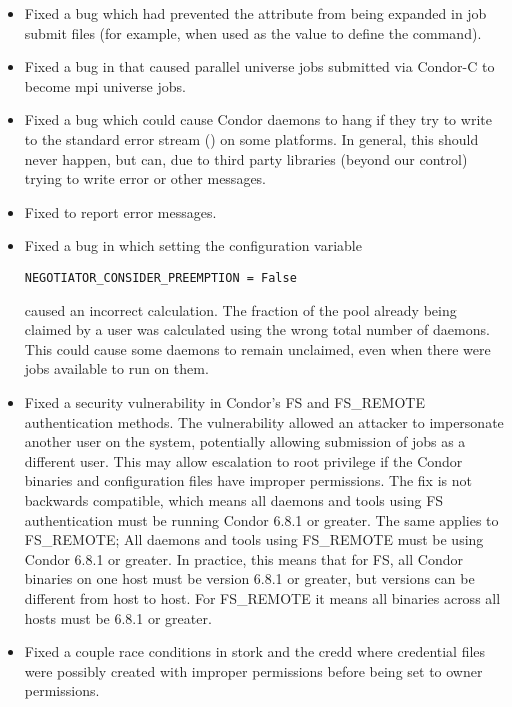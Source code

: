 \begin{itemize}
\item Fixed a  bug which had prevented the
 attribute from being expanded in job submit files
(for example,
when used as the value to define the  command).

\item Fixed a bug in  that caused parallel universe jobs
submitted via Condor-C to become mpi universe jobs.

\item Fixed a bug which could cause Condor daemons to hang if they try
to write to the standard error stream () on some platforms.  In
general, this should never happen, but can, due to third party
libraries (beyond our control) trying to write error or other messages.

\item Fixed  to report error messages.

\item Fixed a bug in which setting the configuration variable 
\begin{verbatim}
NEGOTIATOR_CONSIDER_PREEMPTION = False
\end{verbatim}
caused an incorrect calculation.
The fraction of the pool already being claimed by a user was
calculated using the wrong total number of  daemons.
This could cause some  daemons to remain unclaimed,
even when there were jobs available to run on them.

\item Fixed a security vulnerability in Condor's FS and FS\_REMOTE
authentication methods.  The vulnerability allowed an attacker to impersonate
another user on the system, potentially allowing submission of jobs as a
different user.  This may allow escalation to root privilege if the Condor
binaries and configuration files have improper permissions.  The fix is not
backwards compatible, which means all daemons and tools using FS authentication
must be running Condor 6.8.1 or greater.  The same applies to FS\_REMOTE; All
daemons and tools using FS\_REMOTE must be using Condor 6.8.1 or greater.  In
practice, this means that for FS, all Condor binaries on one host must be
version 6.8.1 or greater, but versions can be different from host to host.  For
FS\_REMOTE it means all binaries across all hosts must be 6.8.1 or greater.

\item Fixed a couple race conditions in stork and the credd where credential
files were possibly created with improper permissions before being set to owner
permissions.


\end{itemize}
